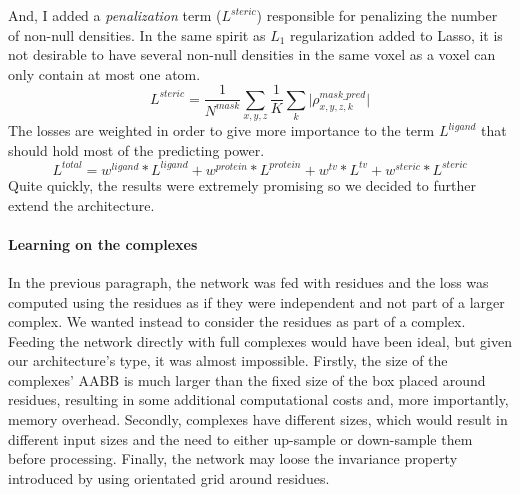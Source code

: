 \documentclass{article}
\begin{document}
And, I added a \textit{penalization} term ($L^{steric}$) responsible for penalizing the number of non-null densities. In the same spirit as $L_1$ regularization added to Lasso, it is not desirable to have several non-null densities in the same voxel as a voxel can only contain at most one atom.
$$
L^{steric} = \frac{1}{N^{mask}} \sum_{x,y,z} \frac{1}{K} \sum_{k} \vert \rho_{x,y,z,k}^{mask\_pred} \vert
$$
The losses are weighted in order to give more importance to the term $L^{ligand}$ that should hold most of the predicting power.
$$
L^{total} = w^{ligand} * L^{ligand} + w^{protein} * L^{protein} + w^{tv} * L^{tv} + w^{steric} * L^{steric}
$$
Quite quickly, the results were extremely promising so we decided to further extend the architecture.

\paragraph{Learning on the complexes}
In the previous paragraph, the network was fed with residues and the loss was computed using the residues as if they were independent and not part of a larger complex. We wanted instead to consider the residues as part of a complex. Feeding the network directly with full complexes would have been ideal, but given our architecture's type, it was almost impossible. Firstly, the size of the complexes' AABB is much larger than the fixed size of the box placed around residues, resulting in some additional computational costs and, more importantly, memory overhead. Secondly, complexes have different sizes, which would result in different input sizes and the need to either up-sample or down-sample them before processing. Finally, the network may loose the invariance property introduced by using orientated grid around residues. \\
\end{document}
